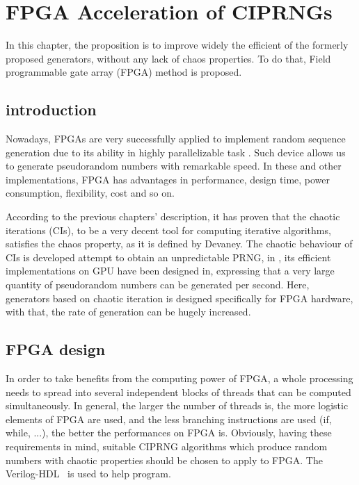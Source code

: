 \chapter{FPGA Acceleration of CIPRNGs}
In this chapter, the proposition is to improve widely the efficient of the formerly proposed generators, without any lack of chaos properties. To do that, Field programmable gate array (FPGA) method is proposed.

\section{introduction}
Nowadays, FPGAs are very successfully applied to implement random sequence generation due to its ability in highly parallelizable task \cite{Bojani200663, Danger:2009:HST:1645457.1645933, Tsoi:2003:CFT:938383.938400}. Such device allows us to generate pseudorandom numbers with remarkable speed. In these and other implementations, FPGA has advantages in performance, design time, power consumption, flexibility, cost and so on.

According to the previous chapters' description, it has proven that the chaotic iterations (CIs), to be a very decent tool for computing iterative algorithms, satisfies the chaos property, as it is defined by Devaney. The chaotic behaviour of CIs is developed attempt to obtain an unpredictable PRNG, in \cite{DBLP:journals/corr/abs-1112-5239}, its efficient implementations on GPU have been designed in, expressing that a very large quantity of pseudorandom numbers can be generated per second. Here, generators based on chaotic iteration is designed specifically for FPGA hardware, with that, the rate of generation can be hugely increased.

\section{FPGA design}
\label{FPGA design}
In order to take benefits from the computing power of FPGA, a whole processing needs to spread into several independent blocks  of threads that can be computed simultaneously. In general,  the larger the number of  threads is, the more logistic elements of FPGA are used, and the less branching  instructions are used  (if,  while,  ...),  the  better the  performances  on  FPGA  is. Obviously, having these requirements in  mind, suitable CIPRNG algorithms which produce random numbers with chaotic properties should be chosen to apply to FPGA. The Verilog-HDL~\cite{verilog} is used to help program. 

